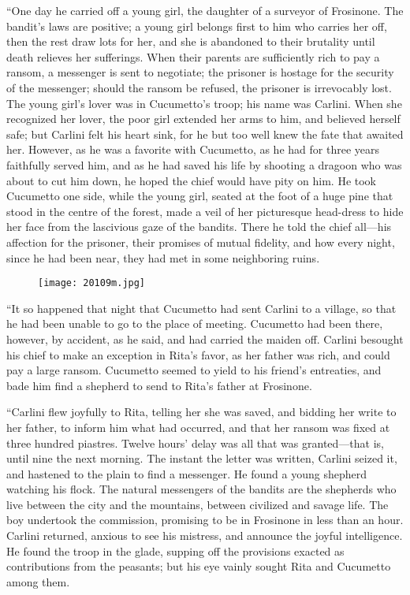 “One day he carried off a young girl, the daughter of a surveyor of
Frosinone. The bandit’s laws are positive; a young girl belongs first
to him who carries her off, then the rest draw lots for her, and she is
abandoned to their brutality until death relieves her sufferings. When
their parents are sufficiently rich to pay a ransom, a messenger is
sent to negotiate; the prisoner is hostage for the security of the
messenger; should the ransom be refused, the prisoner is irrevocably
lost. The young girl’s lover was in Cucumetto’s troop; his name was
Carlini. When she recognized her lover, the poor girl extended her arms
to him, and believed herself safe; but Carlini felt his heart sink, for
he but too well knew the fate that awaited her. However, as he was a
favorite with Cucumetto, as he had for three years faithfully served
him, and as he had saved his life by shooting a dragoon who was about
to cut him down, he hoped the chief would have pity on him. He took
Cucumetto one side, while the young girl, seated at the foot of a huge
pine that stood in the centre of the forest, made a veil of her
picturesque head-dress to hide her face from the lascivious gaze of the
bandits. There he told the chief all—his affection for the prisoner,
their promises of mutual fidelity, and how every night, since he had
been near, they had met in some neighboring ruins.

\begin{figure}[ht]
\texttt{[image: 20109m.jpg]}
\end{figure}

“It so happened that night that Cucumetto had sent Carlini to a
village, so that he had been unable to go to the place of meeting.
Cucumetto had been there, however, by accident, as he said, and had
carried the maiden off. Carlini besought his chief to make an exception
in Rita’s favor, as her father was rich, and could pay a large ransom.
Cucumetto seemed to yield to his friend’s entreaties, and bade him find
a shepherd to send to Rita’s father at Frosinone.

“Carlini flew joyfully to Rita, telling her she was saved, and bidding
her write to her father, to inform him what had occurred, and that her
ransom was fixed at three hundred piastres. Twelve hours’ delay was all
that was granted—that is, until nine the next morning. The instant the
letter was written, Carlini seized it, and hastened to the plain to
find a messenger. He found a young shepherd watching his flock. The
natural messengers of the bandits are the shepherds who live between
the city and the mountains, between civilized and savage life. The boy
undertook the commission, promising to be in Frosinone in less than an
hour. Carlini returned, anxious to see his mistress, and announce the
joyful intelligence. He found the troop in the glade, supping off the
provisions exacted as contributions from the peasants; but his eye
vainly sought Rita and Cucumetto among them.

